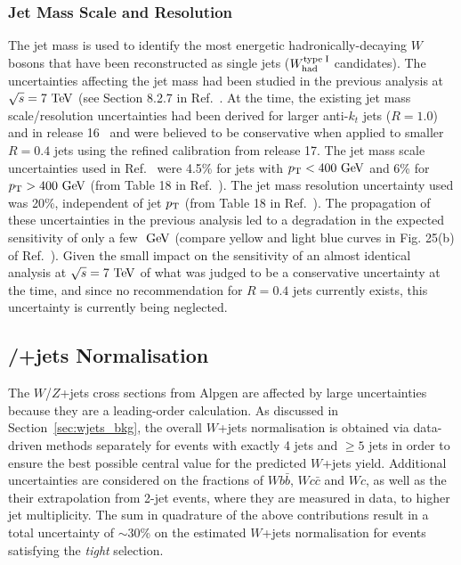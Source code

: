 \subsubsection{Jet Mass Scale and Resolution}
The jet mass is used  to identify the most energetic hadronically-decaying $W$ bosons that have been reconstructed as  single jets
($W_{\rm had}^{\rm type\;I}$ candidates). The uncertainties affecting the jet mass had been studied in the previous analysis at $\sqrt{s}=7\tev$ 
(see Section  8.2.7 in Ref.~\cite{atlas_WbWb_5fb_ljets_backup}. At the time, the existing jet mass scale/resolution uncertainties had been derived for larger anti-$k_t$ jets 
($R=1.0$) and in release 16~\cite{jet_mass_2011} and were believed to be conservative when applied to smaller $R=0.4$ jets using the 
refined calibration from release 17.  The jet mass scale uncertainties used in Ref.~\cite{atlas_WbWb_5fb_ljets_backup} were
4.5\% for jets with $\pt<400\gev$ and 6\% for $\pt>400\gev$ (from Table 18 in Ref.~\cite{jet_mass_2011}). The jet mass resolution
uncertainty used was 20\%, independent of jet $\pt$ (from Table 18 in Ref.~\cite{jet_mass_2011}). 
The propagation of these uncertainties in the previous analysis led to a degradation in the expected sensitivity of only a few $\gev$
(compare yellow and light blue curves in Fig. 25(b) of Ref.~\cite{atlas_WbWb_5fb_ljets_backup}). Given the small impact on the
sensitivity of an almost identical analysis at $\sqrt{s}=7\tev$ of what was judged to be a conservative uncertainty at the time, and since
no recommendation for  $R=0.4$ jets currently exists,  this uncertainty is currently being neglected.

\subsection{\Wboson/\Zboson+jets Normalisation}
\label{sec:syst_vjetsnormWBX}
The $W$/$Z$+jets cross sections from {\sc Alpgen} are affected by large uncertainties because they 
are a leading-order calculation. 
As discussed in Section~\ref{sec:wjets_bkg}, the overall $W$+jets normalisation is obtained via data-driven methods 
separately for events with exactly 4 jets and $\geq 5$ jets in order to ensure the best possible central value for the 
predicted $W$+jets yield. 
Additional uncertainties are considered on the fractions of $Wb\bar{b}$, $Wc\bar{c}$ and $Wc$,
as well as the their extrapolation from 2-jet events, where they are measured in data,  to higher jet multiplicity. 
The sum in quadrature of the above contributions result in a total uncertainty of $\sim$30\% on
the estimated $W$+jets normalisation for events satisfying the {\sl tight} selection.


